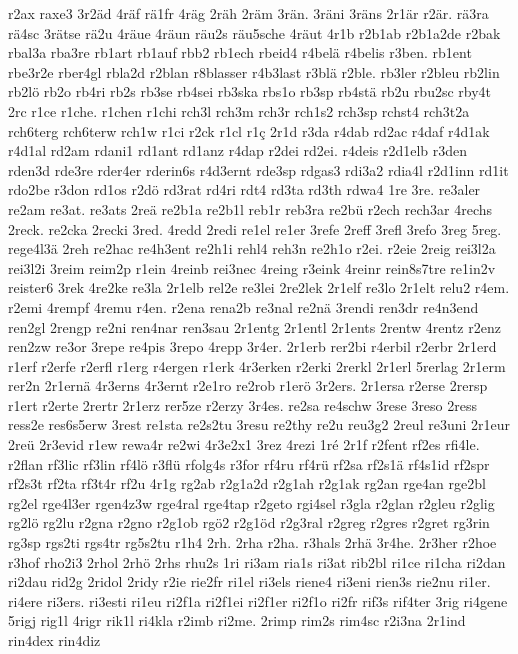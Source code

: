 {r2ax
raxe3
3r2äd
4räf
rä1fr
4räg
2räh
2räm
3rän.
3räni
3räns
2r1är
r2är.
rä3ra
rä4sc
3rätse
rä2u
4räue
4räun
räu2s
räu5sche
4räut
4r1b
r2b1ab
r2b1a2de
r2bak
rbal3a
rba3re
rb1art
rb1auf
rbb2
rb1ech
rbeid4
r4belä
r4belis
r3ben.
rb1ent
rbe3r2e
rber4gl
rbla2d
r2blan
r8blasser
r4b3last
r3blä
r2ble.
rb3ler
r2bleu
rb2lin
rb2lö
rb2o
rb4ri
rb2s
rb3se
rb4sei
rb3ska
rbs1o
rb3sp
rb4stä
rb2u
rbu2sc
rby4t
2rc
r1ce
r1che.
r1chen
r1chi
rch3l
rch3m
rch3r
rch1s2
rch3sp
rchst4
rch3t2a
rch6terg
rch6terw
rch1w
r1ci
r2ck
r1cl
r1ç
2r1d
r3da
r4dab
rd2ac
r4daf
r4d1ak
r4d1al
rd2am
rdani1
rd1ant
rd1anz
r4dap
r2dei
rd2ei.
r4deis
r2d1elb
r3den
rden3d
rde3re
rder4er
rderin6s
r4d3ernt
rde3sp
rdgas3
rdi3a2
rdia4l
r2d1inn
rd1it
rdo2be
r3don
rd1os
r2dö
rd3rat
rd4ri
rdt4
rd3ta
rd3th
rdwa4
1re
3re.
re3aler
re2am
re3at.
re3ats
2reä
re2b1a
re2b1l
reb1r
reb3ra
re2bü
r2ech
rech3ar
4rechs
2reck.
re2cka
2recki
3red.
4redd
2redi
re1el
re1er
3refe
2reff
3refl
3refo
3reg
5reg.
rege4l3ä
2reh
re2hac
re4h3ent
re2h1i
rehl4
reh3n
re2h1o
r2ei.
r2eie
2reig
rei3l2a
rei3l2i
3reim
reim2p
r1ein
4reinb
rei3nec
4reing
r3eink
4reinr
rein8s7tre
re1in2v
reister6
3rek
4re2ke
re3la
2r1elb
rel2e
re3lei
2re2lek
2r1elf
re3lo
2r1elt
relu2
r4em.
r2emi
4rempf
4remu
r4en.
r2ena
rena2b
re3nal
re2nä
3rendi
ren3dr
re4n3end
ren2gl
2rengp
re2ni
ren4nar
ren3sau
2r1entg
2r1entl
2r1ents
2rentw
4rentz
r2enz
ren2zw
re3or
3repe
re4pis
3repo
4repp
3r4er.
2r1erb
rer2bi
r4erbil
r2erbr
2r1erd
r1erf
r2erfe
r2erfl
r1erg
r4ergen
r1erk
4r3erken
r2erki
2rerkl
2r1erl
5rerlag
2r1erm
rer2n
2r1ernä
4r3erns
4r3ernt
r2e1ro
re2rob
r1erö
3r2ers.
2r1ersa
r2erse
2rersp
r1ert
r2erte
2rertr
2r1erz
rer5ze
r2erzy
3r4es.
re2sa
re4schw
3rese
3reso
2ress
ress2e
res6s5erw
3rest
re1sta
re2s2tu
3resu
re2thy
re2u
reu3g2
2reul
re3uni
2r1eur
2reü
2r3evid
r1ew
rewa4r
re2wi
4r3e2x1
3rez
4rezi
1ré
2r1f
r2fent
rf2es
rfi4le.
r2flan
rf3lic
rf3lin
rf4lö
r3flü
rfolg4s
r3for
rf4ru
rf4rü
rf2sa
rf2s1ä
rf4s1id
rf2spr
rf2s3t
rf2ta
rf3t4r
rf2u
4r1g
rg2ab
r2g1a2d
r2g1ah
r2g1ak
rg2an
rge4an
rge2bl
rg2el
rge4l3er
rgen4z3w
rge4ral
rge4tap
r2geto
rgi4sel
r3gla
r2glan
r2gleu
r2glig
rg2lö
rg2lu
r2gna
r2gno
r2g1ob
rgö2
r2g1öd
r2g3ral
r2greg
r2gres
r2gret
rg3rin
rg3sp
rgs2ti
rgs4tr
rg5s2tu
r1h4
2rh.
2rha
r2ha.
r3hals
2rhä
3r4he.
2r3her
r2hoe
r3hof
rho2i3
2rhol
2rhö
2rhs
rhu2s
1ri
ri3am
ria1s
ri3at
rib2bl
ri1ce
ri1cha
ri2dan
ri2dau
rid2g
2ridol
2ridy
r2ie
rie2fr
ri1el
ri3els
riene4
ri3eni
rien3s
rie2nu
ri1er.
ri4ere
ri3ers.
ri3esti
ri1eu
ri2f1a
ri2f1ei
ri2f1er
ri2f1o
ri2fr
rif3s
rif4ter
3rig
ri4gene
5rigj
rig1l
4rigr
rik1l
ri4kla
r2imb
ri2me.
2rimp
rim2s
rim4sc
r2i3na
2r1ind
rin4dex
rin4diz
}
